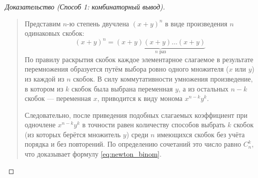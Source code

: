 \begin{proof}[Доказательство (Способ 1: комбинаторный вывод)]~\\
    \begin{quote}
        Представим $n$-ю степень двучлена $(x + y)^n$ в виде произведения 
        $n$ одинаковых скобок:
        \[
            (x + y)^n = \underbrace{(x + y)(x + y) \dots (x + y)}_{n \text{ раз}}
        \]
        По правилу раскрытия скобок каждое элементарное слагаемое в 
        результате перемножения образуется путём выбора ровно одного 
        множителя ($x$ или $y$) из каждой из $n$ скобок. В силу 
        коммутативности умножения произведение, в котором из $k$ скобок 
        была выбрана переменная $y$, а из остальных $n - k$ скобок --- 
        переменная $x$, приводится к виду монома $x^{n-k} y^k$.

        Следовательно, после приведения подобных слагаемых коэффициент при 
        одночлене $x^{n-k} y^k$ в точности равен количеству способов 
        выбрать $k$ скобок (из которых берётся множитель $y$) среди $n$ 
        имеющихся скобок без учёта порядка и без повторений. По определению 
        сочетаний это число равно $C_n^k$, что доказывает формулу 
        \eqref{eq:newton_binom}.
    \end{quote}
\end{proof}

